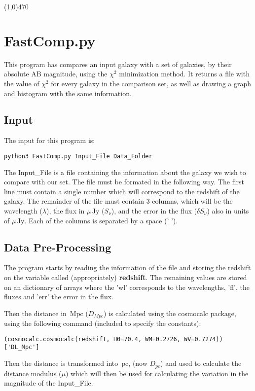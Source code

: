 \documentclass[11pt]{report}
\newcommand{\unit}[1]{\ensuremath{\, \mathrm{#1}}}
\newcommand{\horline}{\begin{center} \line(1,0){470} \end{center}}
\begin{document}
\horline 

\section{FastComp.py}

This program has compares an input galaxy with a set of galaxies, by their absolute AB magnitude, using the $\chi^2$ minimization method. It returns a file with the value of $\chi^2$ for every galaxy in the comparison set, as well as drawing a graph and histogram with the same information.

\subsection{Input}

The input for this program is:
\begin{verbatim}
python3 FastComp.py Input_File Data_Folder
\end{verbatim}

The Input\_File is a file containing the information about the galaxy we wish to compare with our set. The file must be formated in the following way. The first line must contain a single number which will correspond to the redshift of the galaxy. The remainder of the file must contain 3 columns, which will be the wavelength ($\lambda$), the flux in $\mu \unit{Jy}$ ($S_\nu$), and the error in the flux ($\delta S_\nu$) also in units of $\mu \unit{Jy}$.
Each of the columns is separated by a space (' ').

\subsection{Data Pre-Processing}

The program starts by reading the information of the file and storing the redshift on the variable called (appropriately) {\bf redshift}. The remaining values are stored on an dictionary of arrays where the 'wl' corresponds to the wavelengths, 'fl', the fluxes and 'err' the error in the flux.

Then the distance in $\unit{Mpc}$ ($D_{Mpc}$) is calculated using the cosmocalc package, using the following command (included to specify the constants):
\begin{verbatim}
(cosmocalc.cosmocalc(redshift, H0=70.4, WM=0.2726, WV=0.7274))['DL_Mpc']
\end{verbatim}

Then the distance is transformed into $\unit{pc}$, (now $D_{pc}$) and used to calculate the distance modulus ($\mu$) which will then be used for calculating the variation in the magnitude of the Input\_File.
\end{document}
